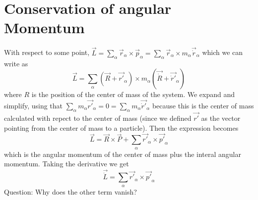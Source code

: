 \documentclass{homework}
\begin{document}
\section{Conservation of angular Momentum}
With respect to some point, $\vec{L} = \sum_{\alpha}\vec{r}_{\alpha} \times \vec{p}_{\alpha} = \sum_{\alpha}\vec{r}_{\alpha} \times  m_{\alpha}\vec{\dot{r}}_{\alpha}$ which we can write as 
\[\vec{L} = \sum_{\alpha} (\vec{R} + \vec{r'}_{\alpha}) \times m_{\alpha}(\vec{\dot{R}} + \vec{\dot{r}'}_{\alpha})\]
where $R$ is the position of the center of mass of the system. We expand and simplify, using that $\sum_{\alpha}m_{\alpha}\vec {r'}_{\alpha} = 0= \sum_{\alpha}m_{\alpha}\vec {\dot{r}'}_{\alpha}$ because this is the center of mass calculated with repect to the center of mass (since we defined $\vec{r'}$ as the vector pointing from the center of mass to a particle). Then the expression becomes
\[\vec{L} = \vec{R} \times \vec{P} + \sum_{\alpha}\vec{r'}_{\alpha} \times \vec{p'}_{\alpha}\]
which is the angular momentum of the center of mass plus the interal angular momentum. 
Taking the derivative we get
\[\vec{\dot{L}} = \sum_{\alpha}\vec{r'}_{\alpha} \times \vec{p'}_{\alpha}\]
Question: Why does the other term vanish?
\end{document}
